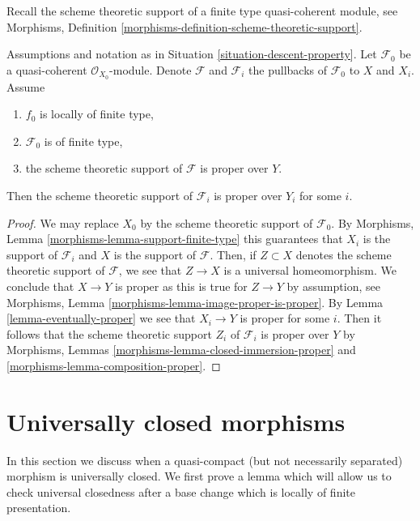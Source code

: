 \noindent
Recall the scheme theoretic support of
a finite type quasi-coherent module, see
Morphisms, Definition \ref{morphisms-definition-scheme-theoretic-support}.

\begin{lemma}
\label{lemma-eventually-proper-support}
Assumptions and notation as in Situation \ref{situation-descent-property}.
Let $\mathcal{F}_0$ be a quasi-coherent $\mathcal{O}_{X_0}$-module.
Denote $\mathcal{F}$ and $\mathcal{F}_i$ the pullbacks of
$\mathcal{F}_0$ to $X$ and $X_i$. Assume
\begin{enumerate}
\item $f_0$ is locally of finite type,
\item $\mathcal{F}_0$ is of finite type,
\item the scheme theoretic support of $\mathcal{F}$ is proper over $Y$.
\end{enumerate}
Then the scheme theoretic support of $\mathcal{F}_i$ is proper over $Y_i$
for some $i$.
\end{lemma}

\begin{proof}
We may replace $X_0$ by the scheme theoretic support of $\mathcal{F}_0$.
By Morphisms, Lemma \ref{morphisms-lemma-support-finite-type} this
guarantees that $X_i$ is the support of $\mathcal{F}_i$ and $X$ is the
support of $\mathcal{F}$. Then, if $Z \subset X$ denotes the scheme
theoretic support of $\mathcal{F}$, we see that $Z \to X$ is a universal
homeomorphism. We conclude that $X \to Y$ is proper as this is true for
$Z \to Y$ by assumption, see
Morphisms, Lemma \ref{morphisms-lemma-image-proper-is-proper}.
By Lemma \ref{lemma-eventually-proper} we see that $X_i \to Y$ is proper
for some $i$. Then it follows that the scheme theoretic support $Z_i$ of
$\mathcal{F}_i$ is proper over $Y$ by
Morphisms, Lemmas \ref{morphisms-lemma-closed-immersion-proper} and
\ref{morphisms-lemma-composition-proper}.
\end{proof}











\section{Universally closed morphisms}
\label{section-universally-closed}

\noindent
In this section we discuss when a quasi-compact (but not necessarily
separated) morphism is universally closed. We first prove a lemma which
will allow us to check universal closedness after a base change
which is locally of finite presentation.

